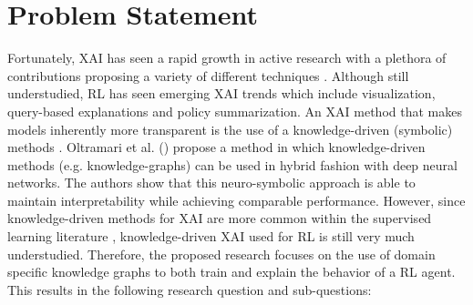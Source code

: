 \documentclass[11pt]{article}
\begin{document}
\section{Problem Statement}
Fortunately, XAI has seen a rapid growth in active research \cite{TIDDI2022103627} with a plethora of contributions proposing a 
variety of different techniques \cite{Xu2015, Ribeiro_Singh_Guestrin_2018, ijcai2019-876}. Although still understudied, RL has seen emerging
XAI trends \cite{Wells2021} which include visualization, query-based explanations and policy summarization. 
An XAI method that makes models inherently more transparent is the use of a knowledge-driven (symbolic) methods \cite{tiddi_knowledge_2022}. Oltramari et al. (\citeyear{Oltramari2020}) propose a method in which
knowledge-driven methods (e.g. knowledge-graphs) can be used in hybrid fashion with deep neural networks. The authors show that this neuro-symbolic approach is able to maintain interpretability while achieving comparable
performance. However, since knowledge-driven methods for XAI are more common within the supervised learning literature \cite{tiddi_knowledge_2022}, knowledge-driven XAI used for RL is still very much understudied.
Therefore, the proposed research focuses on the use of domain specific knowledge graphs to both train and explain the behavior of a RL agent. This results in the following research question and sub-questions:

\end{document}

